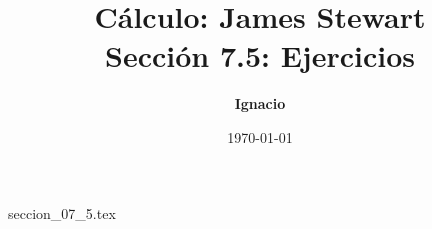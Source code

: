 \documentclass[11pt,spanish,oneside]{report}
\title{\textbf{Cálculo: James Stewart} \\ \Large Sección 7.5: Ejercicios}
\author{\textbf{Ignacio}}
\date{\today}
\begin{document}
\maketitle

{seccion_07_5.tex}
\end{document}
